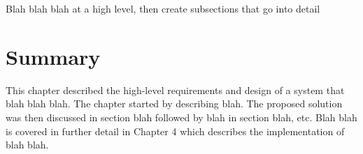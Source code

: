 Blah blah blah at a high level, then create subsections that go into detail

\section{Summary} \label{a-d--summary}

This chapter described the high-level requirements and design of a system that blah blah blah.  The chapter started by describing blah.  The proposed solution was then discussed in section blah followed by blah in section blah, etc. 
Blah blah is covered in further detail in Chapter 4 which describes the implementation of blah blah.